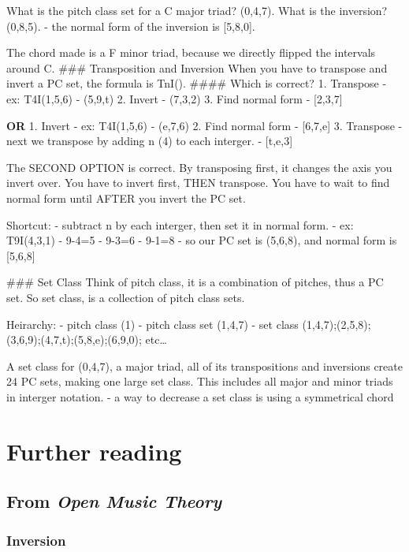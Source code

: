 \documentclass{book}
\begin{document}
What is the pitch class set for a C major triad? (0,4,7). What is the
inversion? (0,8,5). - the normal form of the inversion is {[}5,8,0{]}.

The chord made is a F minor triad, because we directly flipped the intervals
around C. \#\#\# Transposition and Inversion When you have to transpose and
invert a PC set, the formula is TnI(). \#\#\#\# Which is correct? 1. Transpose
- ex: T4I(1,5,6) - (5,9,t) 2. Invert - (7,3,2) 3. Find normal form -
{[}2,3,7{]}

\textbf{OR} 1. Invert - ex: T4I(1,5,6) - (e,7,6) 2. Find normal form -
{[}6,7,e{]} 3. Transpose - next we transpose by adding n (4) to each interger.
- {[}t,e,3{]}

The SECOND OPTION is correct. By transposing first, it changes the axis you
invert over. You have to invert first, THEN transpose. You have to wait to
find normal form until AFTER you invert the PC set.

Shortcut: - subtract n by each interger, then set it in normal form. - ex:
T9I(4,3,1) - 9-4=5 - 9-3=6 - 9-1=8 - so our PC set is (5,6,8), and normal form
is {[}5,6,8{]}

\#\#\# Set Class Think of pitch class, it is a combination of pitches, thus a
PC set. So set class, is a collection of pitch class sets.

Heirarchy: - pitch class (1) - pitch class set (1,4,7) - set class
(1,4,7);(2,5,8);(3,6,9);(4,7,t);(5,8,e);(6,9,0); etc\ldots{}

A set class for (0,4,7), a major triad, all of its transpositions and
inversions create 24 PC sets, making one large set class. This includes all
major and minor triads in interger notation. - a way to decrease a set class
is using a symmetrical chord

\hypertarget{further-reading-21}{%
\chapter{Further reading}\label{further-reading-21}}

\hypertarget{from-open-music-theory-20}{%
\section{\texorpdfstring{From \emph{Open Music
Theory}}{From Open Music Theory}}\label{from-open-music-theory-20}}

\hypertarget{inversion-1}{%
\subsection{Inversion}\label{inversion-1}}
\end{document}
